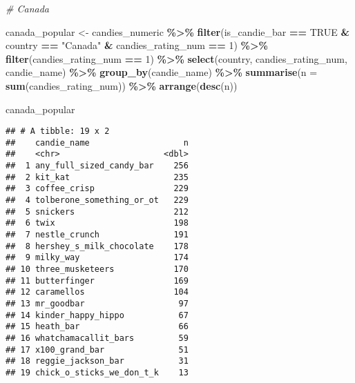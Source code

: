 \documentclass[
]{article}
\newenvironment{Shaded}{\begin{snugshade}}{\end{snugshade}}
\newcommand{\AttributeTok}[1]{\textcolor[rgb]{0.13,0.29,0.53}{#1}}
\newcommand{\CommentTok}[1]{\textcolor[rgb]{0.56,0.35,0.01}{\textit{#1}}}
\newcommand{\ConstantTok}[1]{\textcolor[rgb]{0.56,0.35,0.01}{#1}}
\newcommand{\DecValTok}[1]{\textcolor[rgb]{0.00,0.00,0.81}{#1}}
\newcommand{\FunctionTok}[1]{\textcolor[rgb]{0.13,0.29,0.53}{\textbf{#1}}}
\newcommand{\NormalTok}[1]{#1}
\newcommand{\OtherTok}[1]{\textcolor[rgb]{0.56,0.35,0.01}{#1}}
\newcommand{\SpecialCharTok}[1]{\textcolor[rgb]{0.81,0.36,0.00}{\textbf{#1}}}
\newcommand{\StringTok}[1]{\textcolor[rgb]{0.31,0.60,0.02}{#1}}
\begin{document}
\begin{Shaded}
\begin{Highlighting}[]
\CommentTok{\# Canada}

\NormalTok{canada\_popular }\OtherTok{\textless{}{-}}\NormalTok{ candies\_numeric }\SpecialCharTok{\%\textgreater{}\%} 
  \FunctionTok{filter}\NormalTok{(is\_candie\_bar }\SpecialCharTok{==} \ConstantTok{TRUE} \SpecialCharTok{\&}\NormalTok{ country }\SpecialCharTok{==} \StringTok{"Canada"} \SpecialCharTok{\&}\NormalTok{ candies\_rating\_num }\SpecialCharTok{==} \DecValTok{1}\NormalTok{) }\SpecialCharTok{\%\textgreater{}\%} 
  \FunctionTok{filter}\NormalTok{(candies\_rating\_num }\SpecialCharTok{==} \DecValTok{1}\NormalTok{) }\SpecialCharTok{\%\textgreater{}\%}
  \FunctionTok{select}\NormalTok{(country, candies\_rating\_num, candie\_name) }\SpecialCharTok{\%\textgreater{}\%}
  \FunctionTok{group\_by}\NormalTok{(candie\_name) }\SpecialCharTok{\%\textgreater{}\%} 
  \FunctionTok{summarise}\NormalTok{(}\AttributeTok{n =} \FunctionTok{sum}\NormalTok{(candies\_rating\_num)) }\SpecialCharTok{\%\textgreater{}\%} 
  \FunctionTok{arrange}\NormalTok{(}\FunctionTok{desc}\NormalTok{(n))}

\NormalTok{canada\_popular}
\end{Highlighting}
\end{Shaded}

\begin{verbatim}
## # A tibble: 19 x 2
##    candie_name                   n
##    <chr>                     <dbl>
##  1 any_full_sized_candy_bar    256
##  2 kit_kat                     235
##  3 coffee_crisp                229
##  4 tolberone_something_or_ot   229
##  5 snickers                    212
##  6 twix                        198
##  7 nestle_crunch               191
##  8 hershey_s_milk_chocolate    178
##  9 milky_way                   174
## 10 three_musketeers            170
## 11 butterfinger                169
## 12 caramellos                  104
## 13 mr_goodbar                   97
## 14 kinder_happy_hippo           67
## 15 heath_bar                    66
## 16 whatchamacallit_bars         59
## 17 x100_grand_bar               51
## 18 reggie_jackson_bar           31
## 19 chick_o_sticks_we_don_t_k    13
\end{verbatim}
\end{document}

